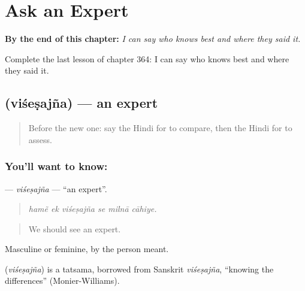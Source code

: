 
\chapter{Ask an Expert}
\label{ch:hi-ask-an-expert}

\begin{chapteropening}
\textbf{By the end of this chapter:} \emph{I can say who knows best and where they said it.}

Complete the last lesson of chapter 364: I can say who knows best and where they said it.
\end{chapteropening}

\section[\texorpdfstring{\hi{विशेषज्ञ} (viśeṣajña)}{विशेषज्ञ (viśeṣajña)}]{ (viśeṣajña) — an expert}

\label{lesson:HI-C364-visesajna}



\begin{quote}
Before the new one: say the Hindi for to compare, then the Hindi for to assess.
\end{quote}

\subsection*{You'll want to know: }
\textbf{} — \emph{viśeṣajña} — \textquotedblleft{}an expert\textquotedblright{}.

\begin{quote}
     
\end{quote}

\begin{quote}
\emph{hamẽ ek viśeṣajña se milnā cāhiye.}
\end{quote}

\begin{quote}
We should see an expert.
\end{quote}

Masculine or feminine, by the person meant.

\begin{cousinweb}
\textbf{} (\emph{viśeṣajña}) is a tatsama, borrowed from Sanskrit \emph{viśeṣajña}, \textquotedblleft{}knowing the differences\textquotedblright{} (Monier-Williams).
\end{cousinweb}

